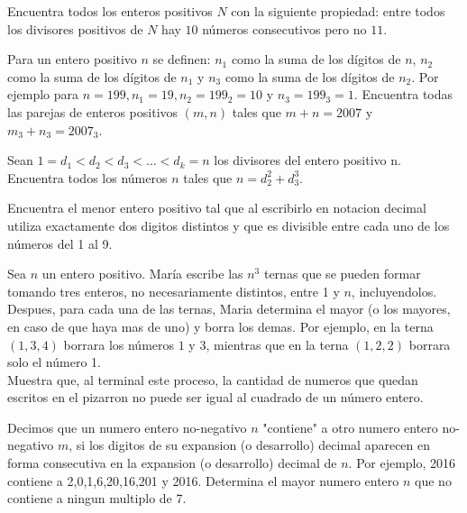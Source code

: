 \documentclass[11pt]{scrartcl}
\begin{document}
\begin{problem}
    [2007/1]
    Encuentra todos los enteros positivos $N$ con la siguiente propiedad: entre todos los divisores positivos de $N$ hay $10$ números consecutivos pero no $11$.
\end{problem}
\begin{problem}
    [2007/4]
    Para un entero positivo $n$ se definen: $n_1$ como la suma de los dígitos de $n$, $n_2$ como la suma de los dígitos de $n_1$ y $n_3$ como la suma de los dígitos de $n_2$. Por ejemplo para $n=199,n_1=19,n_2=199_2=10$ y $n_3=199_3=1$. Encuentra todas las parejas de enteros positivos $(m,n)$ tales que $m+n=2007$ y $m_3+n_3=2007_3$.
\end{problem}
\begin{problem}
    [2008/1]
    Sean $1 = d_1 < d_2 < d_3 < \dots < d_k = n$ los divisores del entero positivo n. Encuentra todos
los números $n$ tales que $n = d_2^2+d_3^3$.
\end{problem}
\begin{problem}
[2011/4] Encuentra el menor entero positivo tal que al escribirlo en notacion decimal utiliza exactamente dos digitos distintos y que es divisible entre cada uno de los números del 1 al 9.
\end{problem}

\begin{problem}
[2015/4] Sea $n$ un entero positivo. María escribe las $n^3$ ternas que se pueden formar tomando tres enteros, no necesariamente distintos, entre 1 y $n$, incluyendolos. Despues, para cada una de las ternas, Maria determina el mayor (o los mayores, en caso de que haya mas de uno) y borra los demas. Por ejemplo, en la terna $(1,3,4)$ borrara los números $1$ y $3$, mientras que en la terna $(1,2,2)$ borrara solo el número 1. \\
Muestra que, al terminal este proceso, la cantidad de numeros que quedan escritos en el pizarron no puede ser igual al cuadrado de un número entero.
\end{problem}

\begin{problem}
[2016/4] Decimos que un numero entero no-negativo $n$ "contiene" a otro numero entero no-negativo $m$, si los digitos de su expansion (o desarrollo) decimal aparecen en forma consecutiva en la expansion (o desarrollo) decimal de $n$. Por ejemplo, 2016 contiene a 2,0,1,6,20,16,201 y 2016. Determina el mayor numero entero $n$ que no contiene a ningun multiplo de 7.
\end{problem}
\end{document}

